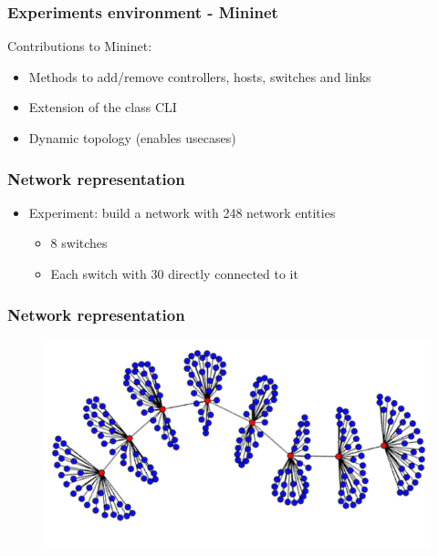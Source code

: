 %
%
\begin{frame}\frametitle{Experiments environment - Mininet}

    Contributions to Mininet:

    \begin{itemize}
        \item Methods to add/remove controllers, hosts, switches and links
        \item Extension of the class CLI
        \item Dynamic topology (enables usecases)
    \end{itemize}

\end{frame}



%
%
\begin{frame}\frametitle{Network representation}

    \begin{itemize}
        \item Experiment: build a network with 248 network entities
        \begin{itemize}    
            \item 8 switches
            \item Each switch with 30 directly connected to it
        \end{itemize}
    \end{itemize}

\end{frame}


%
%
\begin{frame}\frametitle{Network representation}

	\begin{figure}[h]
        \centering
        \hspace*{-1cm}
        \includegraphics[scale=4.0]{img/full-graph}
    \end{figure}
\end{frame}


